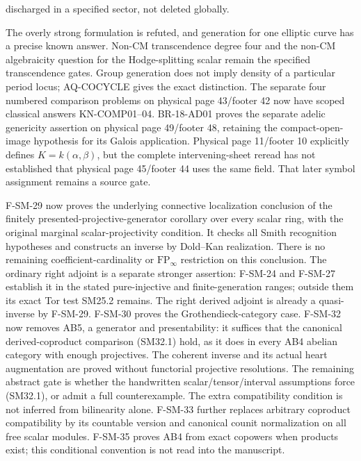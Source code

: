 \begin{description}[style=nextline,leftmargin=0pt]
discharged in a specified sector, not deleted globally.
\item[Cote 18, scans 11--13 and 59: period density.]
The overly strong formulation is refuted, and generation for one
elliptic curve has a precise known answer. Non-CM transcendence degree
four and the non-CM algebraicity question for the Hodge-splitting
scalar remain the specified transcendence gates. Group generation
does not imply density of a particular period locus; AQ-COCYCLE
gives the exact distinction. The separate four numbered comparison
problems on physical page 43/footer 42 now have scoped classical
answers KN-COMP01--04. BR-18-AD01 proves the separate adelic
genericity assertion on physical page 49/footer 48, retaining the
compact-open-image hypothesis for its Galois application.
Physical page 11/footer 10 explicitly defines $K=k(\alpha,\beta)$,
but the complete intervening-sheet reread has not established that
physical page 45/footer 44 uses the same field. That later symbol
assignment remains a source gate.
\item[Cote 134-8, footers 47--54: abstract scope and ordinary right adjoint.]
F-SM-29 now proves the underlying connective localization conclusion
of the finitely presented-projective-generator corollary over every
scalar ring, with the original marginal scalar-projectivity condition.
It checks all Smith recognition hypotheses and constructs an inverse
by Dold--Kan realization. There is no remaining coefficient-cardinality
or $\mathrm{FP}_\infty$ restriction on this conclusion.
The ordinary right adjoint is a separate stronger assertion:
F-SM-24 and F-SM-27 establish it in the stated pure-injective and
finite-generation ranges; outside them its exact Tor test SM25.2
remains. The right derived adjoint is already a quasi-inverse by
F-SM-29. F-SM-30 proves the Grothendieck-category case.
F-SM-32 now removes AB5, a generator and presentability: it suffices
that the canonical derived-coproduct comparison (SM32.1) hold, as it
does in every AB4 abelian category with enough projectives. The
coherent inverse and its actual heart augmentation are proved without
functorial projective resolutions. The remaining abstract gate is
whether the handwritten scalar/tensor/interval assumptions force
(SM32.1), or admit a full counterexample. The extra compatibility
condition is not inferred from bilinearity alone. F-SM-33 further replaces arbitrary coproduct compatibility by its
countable version and canonical counit normalization on all free scalar
modules. F-SM-35 proves AB4 from exact copowers when products exist;
this conditional convention is not read into the manuscript.

\end{description}
